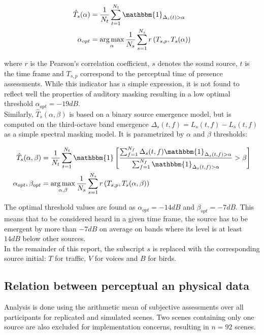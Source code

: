 \documentclass[11pt,a4paper]{article}
\DeclareMathOperator*{\argmax}{arg\,max}
\begin{document}
\begin{align}
\hat T_s(\alpha) &= \frac{1}{N_t}\sum_{t = 1}^{N_t}\mathbbm{1}_{\Delta_s(t)>\alpha}\\
\alpha_{opt} &= \argmax_{\alpha}\frac{1}{N_s}\sum_{s = 1}^{N_s}r\left(T_{s, p}, T_s(\alpha)\right)
\end{align}

where $r$ is the Pearson's correlation coefficient, $s$ denotes the sound source, $t$ is the time frame and $T_{s, p}$ correspond to the perceptual time of presence assessments. While this indicator has a simple expression, it is not found to reflect well the properties of auditory masking resulting in a low optimal threshold $\alpha_{opt} = -19dB$.\\

Similarly, $\hat T_s(\alpha, \beta)$ is based on a binary source emergence model, but is computed on the third-octave band emergence $\Delta_s(t, f) = L_s(t, f) - L_{\bar{s}}(t, f)$ as a simple spectral masking model. It is parametrized by $\alpha$ and $\beta$ thresholds:

\begin{align}
\hat T_s(\alpha, \beta) &= \frac{1}{N_t}\sum_{t = 1}^{N_t}\mathbbm{1}\left[ \frac{\sum_{f = 1}^{N_f}\Delta_s(t, f)\mathbbm{1}_{\Delta_s(t, f)>\alpha}}{\sum_{f = 1}^{N_f}\mathbbm{1}_{\Delta_s(t, f)>\alpha}}>\beta \right]\\
\alpha_{opt},\beta_{opt} &= \argmax_{\alpha, \beta}\frac{1}{N_s}\sum_{s = 1}^{N_s}r\left(T_{s, p}, T_s(\alpha, \beta)\right)
\end{align}

The optimal threshold values are found as $\alpha_{opt} = -14dB$ and $\beta_{opt} = -7dB$. This means that to be considered heard in a given time frame, the source has to be emergent by more than $-7dB$ on average on bands where its level is at least $14dB$ below other sources.\\

In the remainder of this report, the subscript $s$ is replaced with the corresponding source initial: $T$ for traffic, $V$ for voices and $B$ for birds.

\subsection{Relation between perceptual an physical data}
\label{sec:physm}

Analysis is done using the arithmetic mean of subjective assessments over all participants for replicated and simulated scenes. Two scenes containing only one source are also excluded for implementation concerns, resulting in $n=92$ scenes.\\
\end{document}
